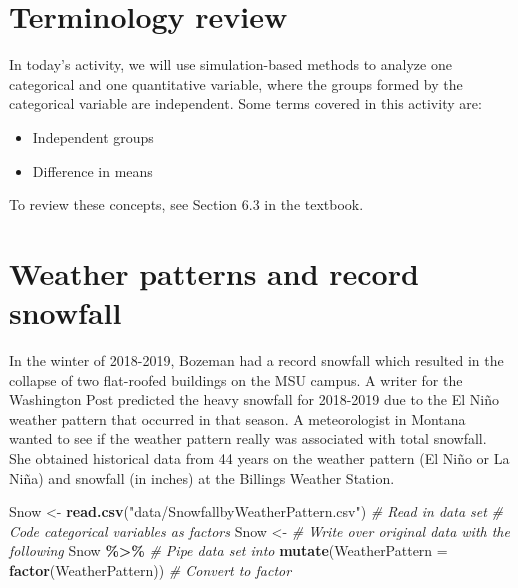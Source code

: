 \documentclass[
]{report}
\newenvironment{Shaded}{\begin{snugshade}}{\end{snugshade}}
\newcommand{\CommentTok}[1]{\textcolor[rgb]{0.56,0.35,0.01}{\textit{#1}}}
\newcommand{\DataTypeTok}[1]{\textcolor[rgb]{0.13,0.29,0.53}{#1}}
\newcommand{\KeywordTok}[1]{\textcolor[rgb]{0.13,0.29,0.53}{\textbf{#1}}}
\newcommand{\NormalTok}[1]{#1}
\newcommand{\OperatorTok}[1]{\textcolor[rgb]{0.81,0.36,0.00}{\textbf{#1}}}
\newcommand{\StringTok}[1]{\textcolor[rgb]{0.31,0.60,0.02}{#1}}
\begin{document}
\hypertarget{terminology-review}{%
\section{Terminology review}\label{terminology-review}}

In today's activity, we will use simulation-based methods to analyze one categorical and one quantitative variable, where the groups formed by the categorical variable are independent. Some terms covered in this activity are:

\begin{itemize}
\item
  Independent groups
\item
  Difference in means
\end{itemize}

To review these concepts, see Section 6.3 in the textbook.

\hypertarget{weather-patterns-and-record-snowfall-1}{%
\section{Weather patterns and record snowfall}\label{weather-patterns-and-record-snowfall-1}}

In the winter of 2018-2019, Bozeman had a record snowfall which resulted in the collapse of two flat-roofed buildings on the MSU campus. A writer for the Washington Post predicted the heavy snowfall for 2018-2019 due to the El Ni\~{n}o weather pattern that occurred in that season. A meteorologist in Montana wanted to see if the weather pattern really was associated with total snowfall. She obtained historical data from 44 years on the weather pattern (El Ni\~{n}o or La Ni\~{n}a) and snowfall (in inches) at the Billings Weather Station.

\begin{Shaded}
\begin{Highlighting}[]
\NormalTok{Snow \textless{}{-}}\StringTok{ }\KeywordTok{read.csv}\NormalTok{(}\StringTok{"data/SnowfallbyWeatherPattern.csv"}\NormalTok{) }\CommentTok{\# Read in data set}
\CommentTok{\# Code categorical variables as factors}
\NormalTok{Snow \textless{}{-}}\StringTok{ }\CommentTok{\# Write over original data with the following}
\StringTok{  }\NormalTok{Snow }\OperatorTok{\%\textgreater{}\%}\StringTok{ }\CommentTok{\# Pipe data set into}
\StringTok{  }\KeywordTok{mutate}\NormalTok{(}\DataTypeTok{WeatherPattern =} \KeywordTok{factor}\NormalTok{(WeatherPattern)) }\CommentTok{\# Convert to factor}
\end{Highlighting}
\end{Shaded}
\end{document}
